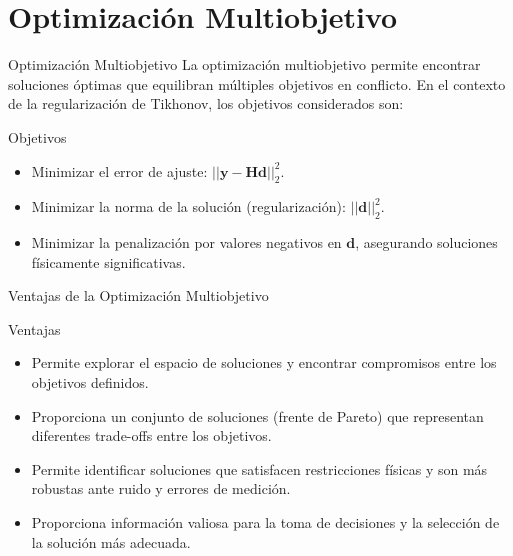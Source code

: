 \documentclass[aspectratio=169,xcolor=dvipsnames]{beamer}
\begin{document}
\section{Optimización Multiobjetivo}

\begin{frame}{Optimización Multiobjetivo}
   La optimización multiobjetivo permite encontrar soluciones óptimas que equilibran múltiples objetivos en conflicto. En el contexto de la regularización de Tikhonov, los objetivos considerados son:
    \begin{block}{Objetivos}
        \begin{itemize}
            \item Minimizar el error de ajuste: \(||\mathbf{y} - \mathbf{H} \mathbf{d}||^2_2\).
            \item Minimizar la norma de la solución (regularización): \(||\mathbf{d}||^2_2\).
            \item Minimizar la penalización por valores negativos en \(\mathbf{d}\), asegurando soluciones físicamente significativas.
        \end{itemize}
    \end{block}
\end{frame}


\begin{frame}{Ventajas de la Optimización Multiobjetivo}
    \begin{block}{Ventajas}
        \begin{itemize}
            \item Permite explorar el espacio de soluciones y encontrar compromisos entre los objetivos definidos.
            \item Proporciona un conjunto de soluciones (frente de Pareto) que representan diferentes trade-offs entre los objetivos.
            \item Permite identificar soluciones que satisfacen restricciones físicas y son más robustas ante ruido y errores de medición.
            \item Proporciona información valiosa para la toma de decisiones y la selección de la solución más adecuada.
        \end{itemize}
    \end{block}
\end{frame}
\end{document}
